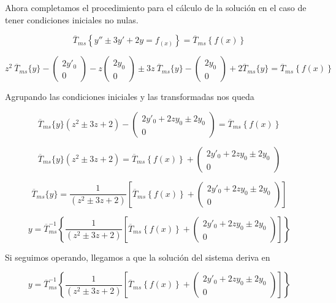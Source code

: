 \documentclass[12pt]{article}
\begin{document}
Ahora completamos el procedimiento para el cálculo de la solución en el caso de tener condiciones iniciales no nulas.

$$
\overline{T}_{ms}\left\{y'' \pm 3y'+2y=f_{(x)}\right\} = \overline{T}_{ms}\left\{f(x)\right\}
$$

$$
z^2\  \overline{T}_{ms}\{y\}
-
\begin{pmatrix}
2y'_0 \\[0.3 cm]
0
\end{pmatrix}
-z
\begin{pmatrix}
2y_0 \\[0.3cm]
0
\end{pmatrix}
\pm3z\  \overline{T}_{ms}\{y\}
-
\begin{pmatrix}
2y_0 \\[0.3 cm]
0
\end{pmatrix}+2\overline{T}_{ms}\{y\} =\overline{T}_{ms}\left\{f(x)\right\}
$$

Agrupando las condiciones iniciales y las transformadas nos queda

$$
\overline{T}_{ms}\{y\} (z^2 \pm 3z +2)
-
\begin{pmatrix}
2y'_0 + 2z y_0 \pm 2y_0 \\[0.3 cm]
0
\end{pmatrix}
=\overline{T}_{ms}\left\{f(x)\right\}
$$


$$
\overline{T}_{ms}\{y\} (z^2 \pm 3z +2)
=\overline{T}_{ms}\left\{f(x)\right\} +\begin{pmatrix}
2y'_0 + 2z y_0 \pm 2y_0 \\[0.3 cm]
0
\end{pmatrix}
$$

$$
\overline{T}_{ms}\{y\} 
=\frac{1}{(z^2 \pm 3z +2)}\left[\overline{T}_{ms}\left\{f(x)\right\} +\begin{pmatrix}
2y'_0 + 2z y_0 \pm 2y_0 \\[0.3 cm]
0
\end{pmatrix}\right]
$$

$$
y = \overline{T}_{ms}^{-1}\left\{\frac{1}{(z^2 \pm 3z +2)}\left[\overline{T}_{ms}\left\{f(x)\right\} +\begin{pmatrix}
2y'_0 + 2z y_0 \pm 2y_0 \\[0.3 cm]
0
\end{pmatrix}\right]\right\}
$$

Si seguimos operando, llegamos a que la solución del sistema deriva en

$$
y = \overline{T}_{ms}^{-1}\left\{\frac{1}{(z^2 \pm 3z +2)}\left[\overline{T}_{ms}\left\{f(x)\right\} +\begin{pmatrix}
2y'_0 + 2z y_0 \pm 2y_0 \\[0.3 cm]
0
\end{pmatrix}\right]\right\}
$$
\end{document}
